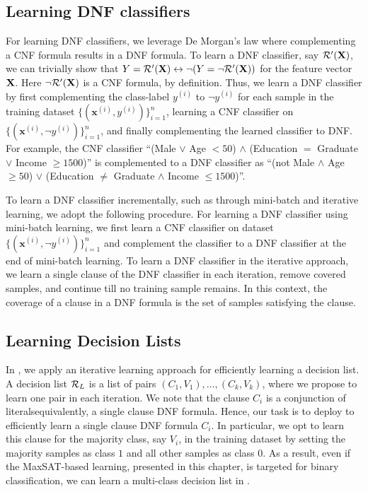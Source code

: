 \subsection{Learning DNF classifiers} 
\label{interpretability_imli_sec:dnf_learning}
For learning DNF classifiers, we leverage De Morgan's law where complementing a CNF formula results in a DNF formula. To learn a DNF classifier, say $ {\mathcal{R}}'(\mathbf{X}) $, we can trivially show that $ Y = {\mathcal{R}}'(\mathbf{X}) \leftrightarrow \neg (Y = \neg {\mathcal{R}}'(\mathbf{X})) $ for the feature vector $ \mathbf{X} $. Here $ \neg {\mathcal{R}}'(\mathbf{X}) $ is a CNF formula, by definition. Thus, we learn a DNF classifier by first complementing the class-label $ y^{(i)} $ to $ \neg y^{(i)} $ for each sample in the training dataset $ \{(\mathbf{x}^{(i)}, y^{(i)})\}_{i=1}^n $, learning a CNF classifier on $ \{(\mathbf{x}^{(i)}, \neg y^{(i)})\}_{i=1}^n $, and finally complementing the learned classifier to DNF. For example, the CNF classifier  ``(Male $ \vee $ Age $ < 50 $) $ \wedge $ (Education $ = $ Graduate $ \vee $ Income  $ \ge 1500 $)'' 	is complemented to a DNF classifier as 	 ``(not Male $ \wedge $ Age $ \ge 50 $) $ \vee $ (Education $ \ne $ Graduate $ \wedge $ Income $ \le 1500 $)''. 


To learn a DNF classifier incrementally, such as through mini-batch and iterative learning, we adopt the following procedure. For learning a DNF classifier using mini-batch learning, we first learn a CNF classifier on dataset $ \{(\mathbf{x}^{(i)}, \neg y^{(i)})\}_{i=1}^n $ and complement the classifier to a DNF classifier at the end of mini-batch learning. To learn a DNF classifier in the iterative approach, we  learn a single clause of the DNF classifier in each iteration, remove covered samples, and continue till no training sample remains. In this context, the coverage of a clause in a DNF formula is the set of samples satisfying the clause. 



\subsection{Learning Decision Lists}
In {\imli}, we apply an iterative learning approach for efficiently learning a  decision list. A decision list  $ {\mathcal{R}}_L $ is a list of pairs $ (C_1, V_1), \dots, (C_k, V_k) $, where we propose to learn one pair in each iteration.  We note that the clause $ C_i $ is a conjunction of literals\textemdash equivalently, a single clause DNF formula. Hence, our task is to deploy {\imli} to efficiently learn a single clause DNF formula $ C_i $. In particular, we opt to learn this clause for the majority class, say $ V_i $, in the training dataset by setting the majority samples as class $ 1 $ and all other samples as class $ 0 $. As a result, even if the MaxSAT-based learning, presented in this chapter, is targeted for binary classification, we can learn a multi-class decision list in {\imli}. 


